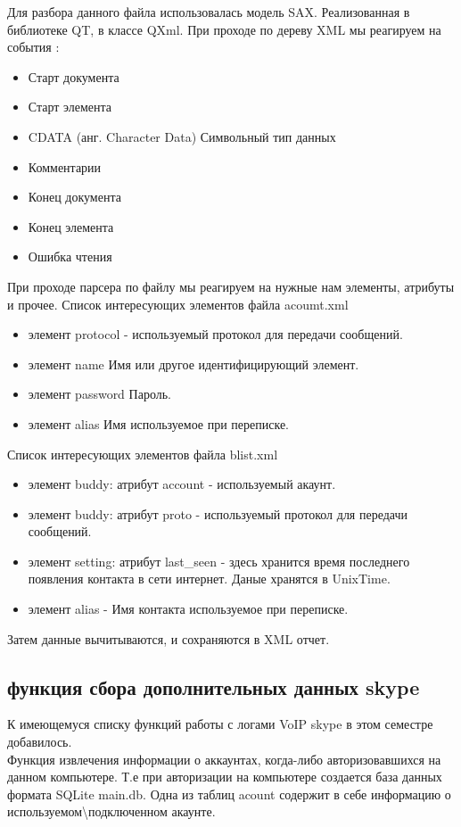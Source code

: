 Для разбора данного файла использовалась модель SAX. Реализованная в библиотеке QT, в классе QXml. При проходе по дереву XML мы реагируем на события \cite{qtdoc}:

\begin{itemize}
\item Старт документа
\item Старт элемента
\item CDATA (анг. Character Data) Символьный тип данных
\item Комментарии
\item Конец документа
\item Конец элемента
\item Ошибка чтения
\end{itemize}

При проходе парсера по файлу мы реагируем на нужные нам элементы, атрибуты и прочее.
Список интересующих элементов файла acoumt.xml

\begin{itemize}
\item	элемент protocol - используемый протокол для передачи сообщений.
\item	элемент name 		Имя или другое идентифицирующий элемент.
\item	элемент password	Пароль.
\item	элемент alias		Имя используемое при переписке.
\end{itemize}

Список интересующих элементов файла blist.xml

\begin{itemize}
\item	элемент buddy: атрибут account - используемый акаунт.
\item	элемент buddy: атрибут proto - используемый протокол для передачи сообщений.
\item	элемент setting: атрибут last\_seen - здесь хранится время последнего появления контакта в сети интернет. Даные хранятся в UnixTime.
\item	элемент alias - Имя контакта используемое при переписке.
\end{itemize}

Затем данные вычитываются, и сохраняются в XML отчет.

\subsection{функция сбора дополнительных данных skype}
К имеющемуся списку функций работы с логами VoIP skype в этом семестре добавилось. 
\\Функция извлечения информации о аккаунтах, когда-либо авторизовавшихся на данном компьютере. Т.е при авторизации на компьютере создается база данных формата SQLite main.db. Одна из таблиц acount содержит в себе информацию о используемом\textbackslash подключенном акаунте. 

